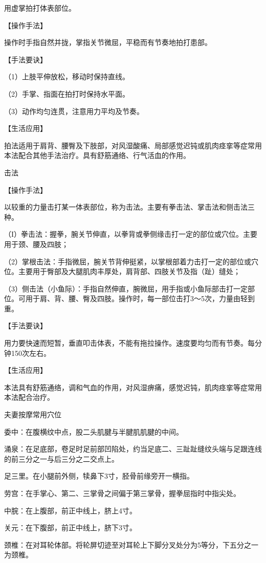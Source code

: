 \documentclass[12pt,UTF8,openany]{ctexbook}
\begin{document}
用虚掌拍打体表部位。

【操作手法】

操作时手指自然并拢，掌指关节微屈，平稳而有节奏地拍打患部。

【手法要诀】

（1）上肢平伸放松，移动时保持直线。

（2）手掌、指面在拍打时保持水平面。

（3）动作均匀连贯，注意用力平均及节奏。

【生活应用】

拍法适用于肩背、腰臀及下肢部，对风湿酸痛、局部感觉迟钝或肌肉痉挛等症常用本法配合其他手法治疗。具有舒筋通络、行气活血的作用。

击法

【操作手法】

以较重的力量击打某一体表部位，称为击法。主要有拳击法、掌击法和侧击法三种。

（I）拳击法：握拳，腕关节伸直，以拳背或拳侧缘击打一定的部位或穴位。主要用于颈、腰及四肢；

（2）掌根击法：手指微屈，腕关节背伸挺紧，以掌根部着力击打一定的部位或穴位。主要用于臀部及大腿肌肉丰厚处，肩背部、四肢关节及指（趾）缝处；

（3）侧击法（小鱼际）：手指自然伸直，腕微屈，用手指或小鱼际部击打一定部位。可用于肩、背、腰、臀及四肢。操作时，每一部位击打3～5次，力量由轻到重。

【手法要诀】

用力要快速而短暂，垂直叩击体表，不能有拖拉操作。速度要均匀而有节奏。每分钟150次左右。

【生活应用】

本法具有舒筋通络，调和气血的作用，对风湿痹痛，感觉迟钝，肌肉痉挛等症常用本法配合治疗。





夫妻按摩常用穴位


委中：在腹横纹中点，股二头肌腱与半腱肌肌腱的中间。

涌泉：在足底部，卷足时足前部凹陷处，约当足底二、三趾趾缝纹头端与足跟连线的前三分之一与后三分之二交点上。

足三里。在小腿前外侧，犊鼻下3寸，胫骨前缘旁开一横指。

劳宫：在手掌心、第二、三掌骨之间偏于第三掌骨，握拳屈指时中指尖处。

中脘：在上腹部，前正中线上，脐上4寸。

关元：在下腹部，前正中线上，脐下3寸。

颈椎：在对耳轮体部。将轮屏切迹至对耳轮上下脚分叉处分为5等分，下五分之一为颈椎。
\end{document}

